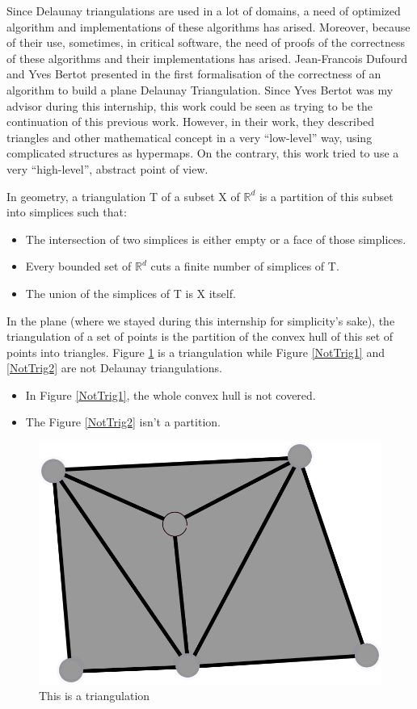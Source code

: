 \documentclass[a4paper,10pt]{article}
\begin{document}
Since Delaunay triangulations are used in a lot of domains, a need of optimized algorithm and implementations of these algorithms has arised. Moreover, because of their use, sometimes, in critical software, the need of proofs of the correctness of these algorithms and their implementations has arised. Jean-Francois Dufourd and Yves Bertot presented in \cite{Bertot} the first formalisation of the correctness of an algorithm to build a plane Delaunay Triangulation. Since Yves Bertot was my advisor during this internship, this work could be seen as trying to be the continuation of this previous work. However, in their work, they described triangles and other mathematical concept in a very ``low-level'' way, using complicated structures as hypermaps. On the contrary, this work tried to use a very ``high-level'', abstract point of view.

In geometry, a triangulation T of a subset X of $\mathbb{R}^d$ is a partition of this subset into simplices such that: 
\begin{itemize}
\item The intersection of two simplices is either empty or a face of those simplices.
\item Every bounded set of $\mathbb{R}^{d}$ cuts a finite number of simplices of T.
  \item The union of the simplices of T is X itself. \label{deftriangulation}
\end{itemize}

In the plane (where we stayed during this internship for simplicity's sake), the triangulation of a set of points is the partition of the convex hull of this set of points into triangles. Figure \ref{Trig1} is a triangulation while Figure \ref{NotTrig1} and \ref{NotTrig2} are not Delaunay triangulations.
\begin{itemize}
\item In Figure \ref{NotTrig1}, the whole convex hull is not covered.
\item The Figure \ref{NotTrig2} isn't a partition.
 \end{itemize}

\begin{figure}
  \centering
  
  \includegraphics[scale=2]{Trig1}
  \caption{\label{Trig1} This is a triangulation}
\end{figure}
\end{document}
